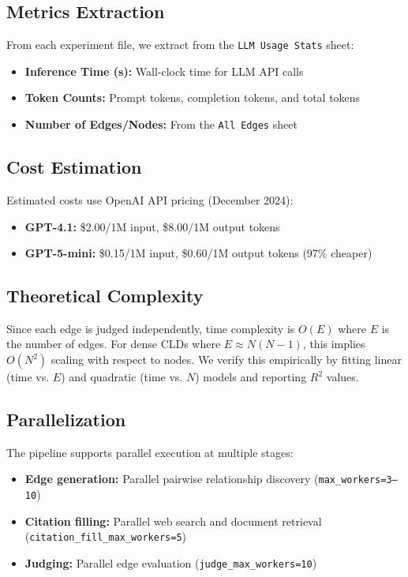\subsection{Metrics Extraction}
From each experiment file, we extract from the \texttt{LLM Usage Stats} sheet:
\begin{itemize}[noitemsep]
    \item \textbf{Inference Time (s):} Wall-clock time for LLM API calls
    \item \textbf{Token Counts:} Prompt tokens, completion tokens, and total tokens
    \item \textbf{Number of Edges/Nodes:} From the \texttt{All Edges} sheet
\end{itemize}

\subsection{Cost Estimation}
Estimated costs use OpenAI API pricing (December 2024):
\begin{itemize}[noitemsep]
    \item \textbf{GPT-4.1:} \$2.00/1M input, \$8.00/1M output tokens
    \item \textbf{GPT-5-mini:} \$0.15/1M input, \$0.60/1M output tokens (97\% cheaper)
\end{itemize}

\subsection{Theoretical Complexity}
Since each edge is judged independently, time complexity is $O(E)$ where $E$ is the number of edges. For dense CLDs where $E \approx N(N-1)$, this implies $O(N^2)$ scaling with respect to nodes. We verify this empirically by fitting linear (time vs. $E$) and quadratic (time vs. $N$) models and reporting $R^2$ values.

\subsection{Parallelization}
The pipeline supports parallel execution at multiple stages:
\begin{itemize}[noitemsep]
    \item \textbf{Edge generation:} Parallel pairwise relationship discovery (\texttt{max\_workers=3--10})
    \item \textbf{Citation filling:} Parallel web search and document retrieval (\texttt{citation\_fill\_max\_workers=5})
    \item \textbf{Judging:} Parallel edge evaluation (\texttt{judge\_max\_workers=10})
\end{itemize}

